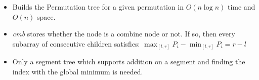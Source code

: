 \begin{itemize}
	\item Builds the Permutation tree for a given permutation in $O(n\log{n})$ time and $O(n)$ space.
  \item \textit{cmb} stores whether the node is a combine node or not. If so, then every subarray of consecutive children satisfies: $\max_{[l,r]}P_i - \min_{[l,r]}P_i = r - l$
  \item Only a segment tree which supports addition on a segment and finding the index with the global minimum is needed.
\end{itemize}
